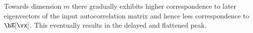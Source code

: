 Towards dimension $m$ there gradually exhibits higher correspondence to later eigenvectors of the input autocorrelation matrix and hence less correspondence to $\hE[\vx]$. This eventually results in the delayed and flattened peak.



